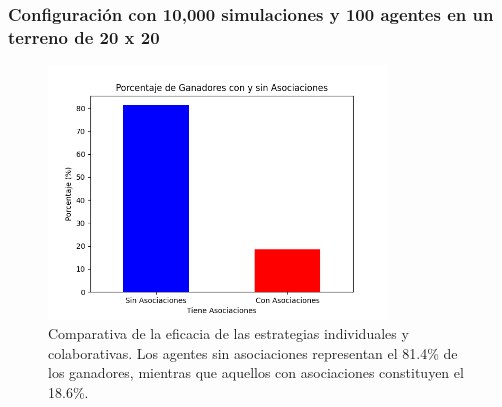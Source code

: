 \documentclass[11pt]{article}
\begin{document}
\subsubsection{Configuración con 10,000 simulaciones y 100 agentes en un terreno de 20 x 20}
\begin{figure}[H]
    \centering
    \includegraphics[width=0.8\textwidth]{images/association_metrics_num_simulations10000_size(20x20)_agents_count100.png}
    \caption{Comparativa de la eficacia de las estrategias individuales y colaborativas. Los agentes sin asociaciones representan el 81.4\% de los ganadores, mientras que aquellos con asociaciones constituyen el 18.6\%.}

\end{figure}


\end{document}
